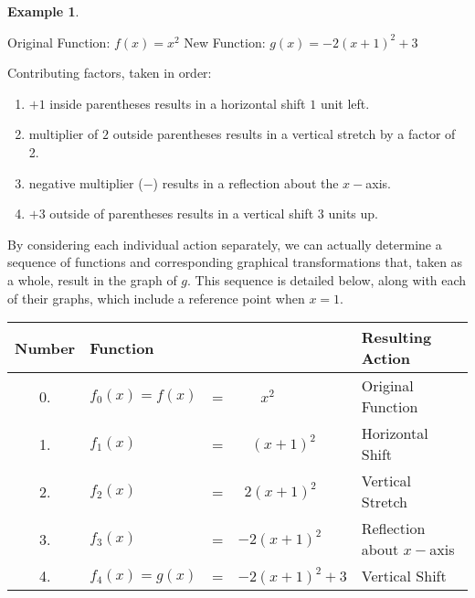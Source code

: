\documentclass[12pt]{book}
\theoremstyle{definition}
\newtheorem{example}{Example}
\begin{document}
\begin{example}
\begin{center}
Original Function: $f(x)=x^2$ \hspace{0.25in} New Function: $g(x)=-2(x+1)^2+3$
\end{center}
\newpage
Contributing factors, taken in order:
\begin{enumerate}
	\item $+1$ inside parentheses results in a horizontal shift $1$ unit left.
	\item multiplier of $2$ outside parentheses results in a vertical stretch by a factor of 2.
	\item negative multiplier ($-$) results in a reflection about the $x-$axis.
	\item $+3$ outside of parentheses results in a vertical shift $3$ units up.
\end{enumerate}
\end{example}
By considering each individual action separately, we can actually determine a sequence of functions and corresponding graphical transformations that, taken as a whole, result in the graph of $g$.  This sequence is detailed below, along with each of their graphs, which include a reference point when $x=1$.
\begin{center}
\begin{tabular}{clcll}
Number & Function &&& Resulting Action\\
\hline
0. & $f_0(x)=f(x)$&=&$~~~~~~~x^2$ & Original Function\\
1. & $f_1(x)$&=&$~~~~(x+1)^2$ & Horizontal Shift\\
2. & $f_2(x)$&=&$~~2(x+1)^2$ & Vertical Stretch\\
3. & $f_3(x)$&=&$-2(x+1)^2$ & Reflection about $x-$axis\\
4. & $f_4(x)=g(x)$&=&$-2(x+1)^2+3$ & Vertical Shift
\end{tabular}
\end{center}
\end{document}
